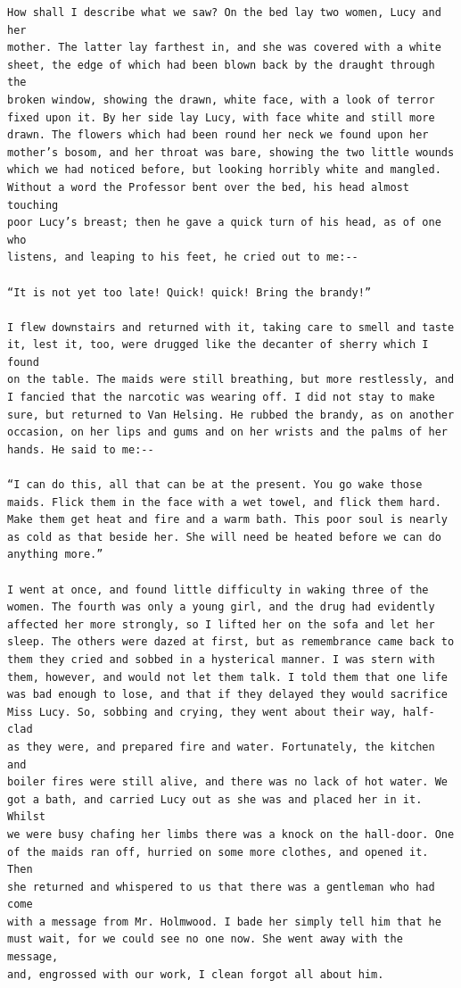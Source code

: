 \documentclass{article}
\begin{document}
\begin{verbatim}
How shall I describe what we saw? On the bed lay two women, Lucy and her
mother. The latter lay farthest in, and she was covered with a white
sheet, the edge of which had been blown back by the draught through the
broken window, showing the drawn, white face, with a look of terror
fixed upon it. By her side lay Lucy, with face white and still more
drawn. The flowers which had been round her neck we found upon her
mother’s bosom, and her throat was bare, showing the two little wounds
which we had noticed before, but looking horribly white and mangled.
Without a word the Professor bent over the bed, his head almost touching
poor Lucy’s breast; then he gave a quick turn of his head, as of one who
listens, and leaping to his feet, he cried out to me:--

“It is not yet too late! Quick! quick! Bring the brandy!”

I flew downstairs and returned with it, taking care to smell and taste
it, lest it, too, were drugged like the decanter of sherry which I found
on the table. The maids were still breathing, but more restlessly, and
I fancied that the narcotic was wearing off. I did not stay to make
sure, but returned to Van Helsing. He rubbed the brandy, as on another
occasion, on her lips and gums and on her wrists and the palms of her
hands. He said to me:--

“I can do this, all that can be at the present. You go wake those
maids. Flick them in the face with a wet towel, and flick them hard.
Make them get heat and fire and a warm bath. This poor soul is nearly
as cold as that beside her. She will need be heated before we can do
anything more.”

I went at once, and found little difficulty in waking three of the
women. The fourth was only a young girl, and the drug had evidently
affected her more strongly, so I lifted her on the sofa and let her
sleep. The others were dazed at first, but as remembrance came back to
them they cried and sobbed in a hysterical manner. I was stern with
them, however, and would not let them talk. I told them that one life
was bad enough to lose, and that if they delayed they would sacrifice
Miss Lucy. So, sobbing and crying, they went about their way, half-clad
as they were, and prepared fire and water. Fortunately, the kitchen and
boiler fires were still alive, and there was no lack of hot water. We
got a bath, and carried Lucy out as she was and placed her in it. Whilst
we were busy chafing her limbs there was a knock on the hall-door. One
of the maids ran off, hurried on some more clothes, and opened it. Then
she returned and whispered to us that there was a gentleman who had come
with a message from Mr. Holmwood. I bade her simply tell him that he
must wait, for we could see no one now. She went away with the message,
and, engrossed with our work, I clean forgot all about him.


\end{verbatim}
\end{document}
